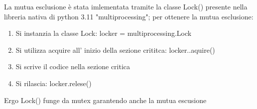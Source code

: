 \documentclass{article}
\begin{document}
La mutua esclusione è stata imlementata tramite la classe Lock() presente nella libreria nativa di python 3.11 "multiprocessing";
per ottenere la mutua esclusione:
\begin{enumerate}
    \item Si instanzia la classe Lock:  locker = multiprocessing.Lock
    \item Si utilizza acquire all' inizio della sezione crititca: locker..aquire()
    \item Si scrive il codice nella sezione critica
    \item Si rilascia: locker.relese()

\end{enumerate}

Ergo Lock() funge da mutex garantendo anche la mutua escusione
\end{document}
